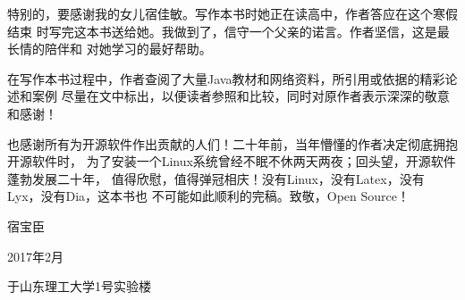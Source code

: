 特别的，要感谢我的女儿宿佳敏。写作本书时她正在读高中，作者答应在这个寒假结束
时写完这本书送给她。我做到了，信守一个父亲的诺言。作者坚信，这是最长情的陪伴和
对她学习的最好帮助。

在写作本书过程中，作者查阅了大量Java教材和网络资料，所引用或依据的精彩论述和案例
尽量在文中标出，以便读者参照和比较，同时对原作者表示深深的敬意和感谢！

也感谢所有为开源软件作出贡献的人们！二十年前，当年懵懂的作者决定彻底拥抱开源软件时，
为了安装一个Linux系统曾经不眠不休两天两夜；回头望，开源软件蓬勃发展二十年，
值得欣慰，值得弹冠相庆！没有Linux，没有Latex，没有Lyx，没有Dia，这本书也
不可能如此顺利的完稿。致敬，Open Source！

\hfill 宿宝臣

\hfill 2017年2月

\hfill 于山东理工大学1号实验楼
\mainmatter
